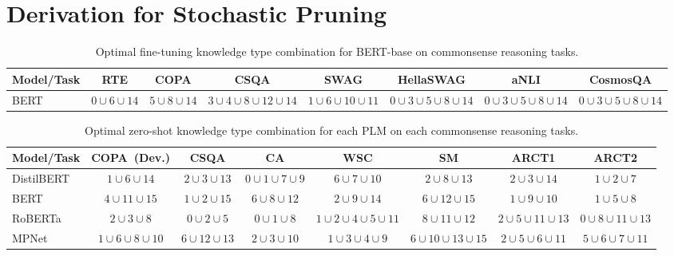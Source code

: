 

\renewcommand\arraystretch{1.2}
\setlength\parskip{0.1\baselineskip}
\setlength{\textfloatsep}{0.5cm}



\appendix
\section{Derivation for Stochastic Pruning}
\begin{table*}[tb!]
	\centering
	\scriptsize
	\begin{tabular}{l|ccccccc}
		\toprule
		\textbf{Model/Task} & \textbf{RTE}&\textbf{COPA} &\textbf{CSQA} &\textbf{SWAG} &\textbf{HellaSWAG} &\textbf{aNLI} &\textbf{CosmosQA} \\
		\midrule
		BERT &$0\cup 6\cup 14$ &$5\cup 8\cup 14$ &$3\cup 4\cup 8\cup 12\cup 14$ &$1\cup 6\cup 10\cup 11$  &$0\cup 3\cup 5\cup 8\cup 14$ &$0\cup 3\cup 5\cup 8\cup 14$ &$0\cup 3\cup 5\cup 8\cup 14$ \\
		\bottomrule
	\end{tabular}
	\caption{Optimal fine-tuning knowledge type combination for BERT-base on commonsense reasoning tasks.}
	\label{table:finetuning}
\end{table*}
\begin{table*}[tb!]
	\centering
	\scriptsize
	\begin{tabular}{l|ccccccc}
		\toprule
		\textbf{Model/Task} &\textbf{COPA~(Dev.)} &\textbf{CSQA} &\textbf{CA} &\textbf{WSC} &\textbf{SM} &\textbf{ARCT1} &\textbf{ARCT2}\\
		\midrule
		DistilBERT  &$1\cup 6\cup 14$ &$2\cup 3\cup 13$ &$0\cup 1\cup 7\cup 9$  &$6\cup 7\cup 10$ &$2\cup 8\cup 13$ &$2\cup 3\cup 14$ &$1\cup 2\cup 7$\\
		BERT  &$4\cup 11\cup 15$ &$1\cup 2\cup 15$ &$6\cup 8\cup 12$  &$2\cup 9\cup 14$ &$6\cup 12\cup 15$ &$1\cup 9\cup 10$ &$1\cup 5\cup 8$\\
		RoBERTa &$2\cup 3\cup 8$  & $0\cup 2\cup 5$&$0\cup 1\cup 8$  &$1\cup 2\cup 4\cup 5\cup 11$ &$8\cup 11\cup 12$ &$2\cup 5\cup 11\cup 13$&$0\cup 8\cup 11\cup 13$\\
		MPNet  &$1\cup 6\cup 8\cup 10$ &$6\cup 12\cup 13$ &$2\cup 3\cup 10$  &$1\cup 3\cup 4\cup 9$ &$6\cup 10\cup 13\cup 15$ &$2\cup 5\cup 6\cup 11$ &$5\cup 6\cup 7\cup 11$ \\
		\bottomrule
	\end{tabular}
	\caption{Optimal zero-shot knowledge type combination for each PLM on each commonsense reasoning tasks.}
	\label{table:zero}
\end{table*}
